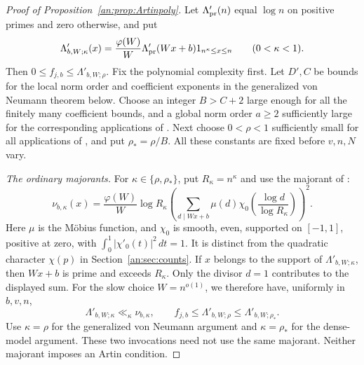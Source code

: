 \documentclass[11pt,reqno]{amsart}
\theoremstyle{definition}
\numberwithin{equation}{section}
\begin{document}
\begin{proof}[Proof of Proposition~\ref{an:prop:Artinpoly}]
Let $\Lambda'_{\rm pr}(n)$ equal $\log n$ on positive primes and zero otherwise, and put
\[
 \Lambda'_{b,W;\kappa}(x)=\frac{\varphi(W)}W
       \Lambda'_{\rm pr}(Wx+b)1_{n^\kappa\le x\le n}
       \qquad(0<\kappa<1).
\]
Then $0\le f_{j,b}\le\Lambda'_{b,W;\rho}$. Fix the polynomial complexity first. Let $D',C$ be bounds for the local norm order and coefficient exponents in the generalized von Neumann theorem below. Choose an integer $B>C+2$ large enough for all the finitely many coefficient bounds, and a global norm order $a\ge2$ sufficiently large for the corresponding applications of \cite[Theorem 2.5 and Corollary 3.9]{TZpoly}. Next choose $0<\rho<1$ sufficiently small for all applications of \cite[Sections 3--4]{TZpoly}, and put $\rho_* =\rho/B$. All these constants are fixed before $v,n,N$ vary.

\emph{The ordinary majorants.}
For $\kappa\in\{\rho,\rho_*\}$, put $R_\kappa=n^\kappa$ and use the majorant of \cite[(3.5)]{TZpoly}:
\[
 \nu_{b,\kappa}(x)=\frac{\varphi(W)}W\log R_\kappa
 \left(\sum_{d\mid Wx+b}\mu(d)
             \chi_0\left(\frac{\log d}{\log R_\kappa}\right)\right)^2.
\]
Here $\mu$ is the M\"obius function, and $\chi_0$ is smooth, even, supported on $[-1,1]$, positive at zero, with $\int_0^1|\chi'_0(t)|^2\,dt=1$. It is distinct from the quadratic character $\chi(p)$ in Section~\ref{an:sec:counts}. If $x$ belongs to the support of $\Lambda'_{b,W;\kappa}$, then $Wx+b$ is prime and exceeds $R_\kappa$. Only the divisor $d=1$ contributes to the displayed sum. For the slow choice $W=n^{o(1)}$, we therefore have, uniformly in $b,v,n$,
\[
 \Lambda'_{b,W;\kappa}\ll_\kappa\nu_{b,\kappa},
 \qquad
 f_{j,b}\le\Lambda'_{b,W;\rho}
       \le\Lambda'_{b,W;\rho_*}.
\]
Use $\kappa=\rho$ for the generalized von Neumann argument and $\kappa=\rho_*$ for the dense-model argument. These two invocations need not use the same majorant. Neither majorant imposes an Artin condition.


\end{proof}
\end{document}

